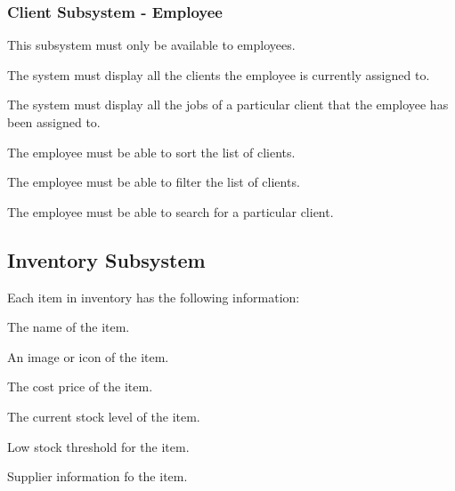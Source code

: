 \documentclass{article}
\begin{document}
	\subsubsection*{Client Subsystem - Employee}	
	\begin{list}{R.}{}
		\item This subsystem must only be available to employees.
		\item The system must display all the clients the employee is currently assigned to.
		\item The system must display all the jobs of a particular client that the employee has been assigned to.
		\item The employee must be able to sort the list of clients.
		\item The employee must be able to filter the list of clients.
		\item The employee must be able to search for a particular client. 		
	\end{list}
	
	\subsection*{Inventory Subsystem}
	\begin{list}{R.}{}
		\item Each item in inventory has the following information:
		\begin{list}{R.}{}
			\item The name of the item. 
			\item An image or icon of the item.
			\item The cost price of the item.
			\item The current stock level of the item.
			\item Low stock threshold for the item.
			\item Supplier information fo the item.
		\end{list}
	\end{list}
\end{document}
